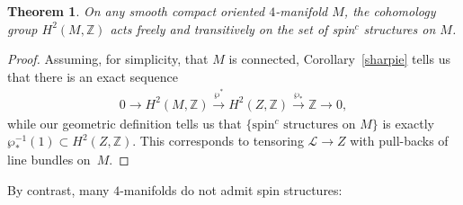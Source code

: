 \documentclass[pdftex]{sigma}
\numberwithin{equation}{section}
\newtheorem{Theorem}{Theorem}[section]
\def\ZZ{\mathbb{Z}}
\begin{document}
\begin{Theorem} On any smooth compact oriented $4$-manifold $M$, the cohomology group $H^2(M, \ZZ)$ acts freely and transitively
on the set of spin$^c$ structures on $M$.
\end{Theorem}
\begin{proof} Assuming, for simplicity, that $M$ is connected, Corollary~\ref{sharpie}
tells us that there is an exact sequence
\begin{gather*}
0\to H^2 (M,\ZZ) \stackrel{\wp^*}{\to} H^2 (Z,\ZZ) \stackrel{\wp_*}{\to} \ZZ \to 0,
\end{gather*}
while our geometric definition tells us that $\{ \mbox{spin$^c$ structures on } M\}$ is exactly
$\wp_*^{-1} (1) \!\subset\! H^2 (Z,\ZZ)$. This corresponds to tensoring $\mathscr{L}\to Z$ with
pull-backs of line bundles on~$M$.
\end{proof}

By contrast, many $4$-manifolds do not admit spin structures:
\end{document}
